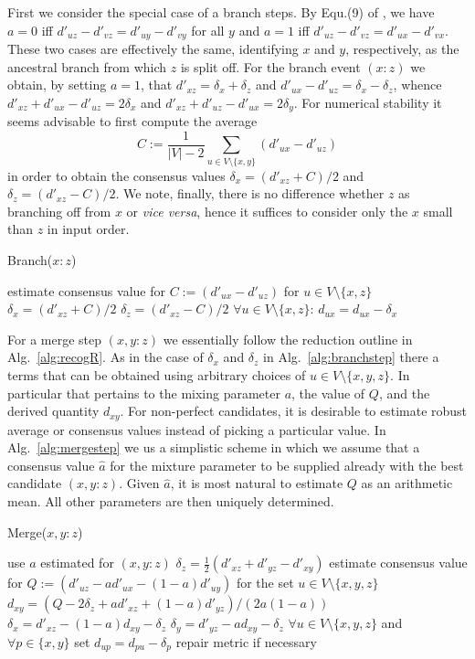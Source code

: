 \documentclass{article}
\begin{document}
First we consider the special case of a branch steps. By Equ.(9) of
\cite{Prohaska:17a}, we have $a=0$ iff $d'_{uz}-d'_{vz} = d'_{uy}-d'_{vy}$
for all $y$ and $a=1$ iff $d'_{uz}-d'_{vz} = d'_{ux}-d'_{vx}$. These two
cases are effectively the same, identifying $x$ and $y$, respectively, as
the ancestral branch from which $z$ is split off. For the branch event
$(x:z)$ we obtain, by setting $a=1$, that $d'_{xz}=\delta_x+\delta_z$ and
$d'_{ux}-d'_{uz}=\delta_x-\delta_z$, whence
$d'_{xz}+d'_{ux}-d'_{uz}=2\delta_x$ and
$d'_{xz}+d'_{uz}-d'_{ux}=2\delta_y$. For numerical stability it seems
advisable to first compute the average
\begin{equation} 
  C := \frac{1}{|V|-2} \sum_{u\in V\setminus\{x,y\}} (d'_{ux}-d'_{uz})
\end{equation} 
in order to obtain the consensus values $\delta_x = (d'_{xz}+C)/2$ and
$\delta_z = (d'_{xz}-C)/2$.  We note, finally, there is no difference
whether $z$ as branching off from $x$ or \textit{vice versa}, hence it
suffices to consider only the $x$ small than $z$ in input order. 

\begin{algorithm}[H]
\caption{Branch($x:z$)} 
\label{alg:branchstep}
\SetAlgoLined
estimate consensus value for $C:=(d'_{ux}-d'_{uz})$ for $u\in
V\setminus\{x,z\}$ \;
$\delta_x = (d'_{xz}+C)/2$\;
$\delta_z = (d'_{xz}-C)/2$\;
$\forall u\in V\setminus\{x,z\}$: $d_{ux} =  d_{ux}-\delta_x$\;
\end{algorithm} 

For a merge step $(x,y:z)$ we essentially follow the reduction outline in
Alg.~\ref{alg:recogR}. As in the case of $\delta_x$ and $\delta_z$ in
Alg.~\ref{alg:branchstep} there a terms that can be obtained using
arbitrary choices of $u\in V\setminus\{x,y,z\}$. In particular that
pertains to the mixing parameter $a$, the value of $Q$, and the derived
quantity $d_{xy}$. For non-perfect candidates, it is desirable to estimate
robust average or consensus values instead of picking a particular value.
In Alg.~\ref{alg:mergestep} we us a simplistic scheme in which we assume
that a consensus value $\hat a$ for the mixture parameter to be supplied
already with the best candidate $(x,y:z)$. Given $\hat a$, it is most
natural to estimate $Q$ as an arithmetic mean. All other parameters are
then uniquely determined.

\begin{algorithm}[H]
\caption{Merge($x,y:z$)} 
\label{alg:mergestep} 
\SetAlgoLined
use $a$ estimated for $(x,y:z)$\;
$\delta_z = \frac{1}{2}(d'_{xz}+d'_{yz}-d'_{xy})$\;
estimate consensus value for $Q:=(d'_{uz}-a d'_{ux}-(1-a) d'_{uy})$ for the 
set $u\in V\setminus\{x,y,z\}$\;
$d_{xy} = (Q-2 \delta_z + a d'_{xz}+(1-a) d'_{yz})/(2a(1-a))$\;
$\delta_x = d'_{xz} - (1-a) d_{xy} - \delta_z$\;
$\delta_y = d'_{yz} -   a   d_{xy} - \delta_z$\;
$\forall u\in V\setminus\{x,y,z\}$ and $\forall p\in\{x,y\}$ set   
$d_{up} = d_{pu} -\delta_p$\;
repair metric if necessary\;
\end{algorithm} 
\end{document}
